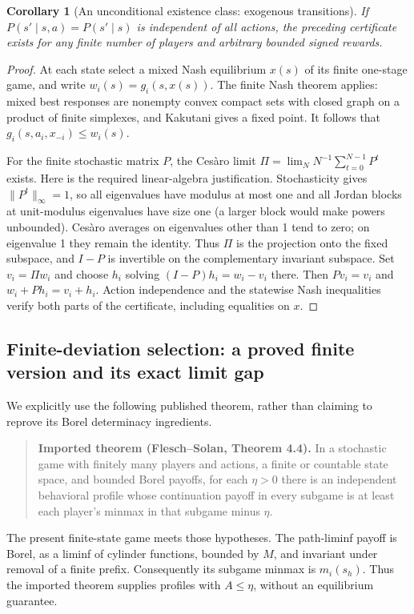 \documentclass[11pt,a4paper]{article}
\newtheorem{corollary}[theorem]{Corollary}
\theoremstyle{definition}
\theoremstyle{remark}
\begin{document}
\begin{corollary}[An unconditional existence class: exogenous transitions]
If $P(s'\mid s,a)=P(s'\mid s)$ is independent of all actions, the preceding certificate exists for any finite number of players and arbitrary bounded signed rewards.
\end{corollary}
\begin{proof}
At each state select a mixed Nash equilibrium $x(s)$ of its finite one-stage game, and write $w_i(s)=g_i(s,x(s))$. The finite Nash theorem applies: mixed best responses are nonempty convex compact sets with closed graph on a product of finite simplexes, and Kakutani gives a fixed point. It follows that $g_i(s,a_i,x_{-i})\leq w_i(s)$.

For the finite stochastic matrix $P$, the Ces\`aro limit $\Pi=\lim_NN^{-1}\sum_{t=0}^{N-1}P^t$ exists. Here is the required linear-algebra justification. Stochasticity gives $\|P^t\|_\infty=1$, so all eigenvalues have modulus at most one and all Jordan blocks at unit-modulus eigenvalues have size one (a larger block would make powers unbounded). Ces\`aro averages on eigenvalues other than 1 tend to zero; on eigenvalue 1 they remain the identity. Thus $\Pi$ is the projection onto the fixed subspace, and $I-P$ is invertible on the complementary invariant subspace. Set $v_i=\Pi w_i$ and choose $h_i$ solving
$(I-P)h_i=w_i-v_i$ there. Then $Pv_i=v_i$ and $w_i+Ph_i=v_i+h_i$. Action independence and the statewise Nash inequalities verify both parts of the certificate, including equalities on $x$.
\end{proof}

\subsection{Finite-deviation selection: a proved finite version and its exact limit gap}
We explicitly use the following published theorem, rather than claiming to reprove its Borel determinacy ingredients.

\begin{quote}
\textbf{Imported theorem (Flesch--Solan, Theorem 4.4).} In a stochastic game with finitely many players and actions, a finite or countable state space, and bounded Borel payoffs, for each $\eta>0$ there is an independent behavioral profile whose continuation payoff in every subgame is at least each player's minmax in that subgame minus $\eta$.
\end{quote}
The present finite-state game meets those hypotheses. The path-liminf payoff is Borel, as a liminf of cylinder functions, bounded by $M$, and invariant under removal of a finite prefix. Consequently its subgame minmax is $m_i(s_h)$. Thus the imported theorem supplies profiles with $A\leq\eta$, without an equilibrium guarantee.
\end{document}
